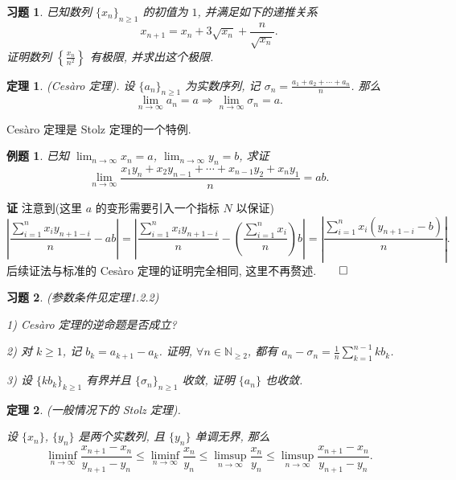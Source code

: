 \documentclass[12pt,a4paper,fontset=none]{ctexart}
\newcounter{theorem_counter}
\theoremstyle{bluehead}
\theoremstyle{greenhead}
\newtheorem{theorem}{定理}[subsection]
\theoremstyle{yellowhead}
\newtheorem{exercise}{习题}[subsection]
\theoremstyle{redhead}
\newtheorem{example}{例题}[subsection]
\begin{document}
\begin{exercise}
已知数列 $\{x_n\}_{n \ge 1}$ 的初值为 $1$, 并满足如下的递推关系
$$
x_{n+1}=x_n+3\sqrt{x_n}+\frac{n}{\sqrt{x_n}}.
$$
证明数列 $\displaystyle \left\{\frac{x_n}{n^2}\right\}$ 有极限, 并求出这个极限.
\end{exercise}

\begin{theorem}
  (Cesàro 定理).
  设 $\{a_n\}_{n \ge 1}$ 为实数序列, 记 $\displaystyle \sigma_n=\frac{a_1+a_2+\cdots +a_n}{n}$. 那么 $$\displaystyle \lim_{n \to \infty} a_n=a \Rightarrow \displaystyle \lim_{n \to \infty} \sigma_n=a.$$
\end{theorem}

Cesàro 定理是 Stolz 定理的一个特例.

\vspace{0.3cm}

\begin{example}
  已知 $\displaystyle \lim_{n \to \infty} x_n=a$, $\displaystyle \lim_{n \to \infty} y_n=b$, 求证
  $$
  \lim_{n \to \infty} \frac{x_1y_n+x_2y_{n-1}+\cdots+x_{n-1}y_2+x_ny_1}{n} = ab.
  $$
\end{example}

\hspace{-2em}\textbf{证} \quad 注意到(这里 $a$ 的变形需要引入一个指标 $N$ 以保证)
$$
\left|\frac{\sum_{i=1}^nx_iy_{n+1-i}}{n}-ab\right|=\left|\frac{\sum_{i=1}^nx_iy_{n+1-i}}{n}-\left(\frac{\sum_{i=1}^nx_i}{n}\right)b\right|=\left|\frac{\sum_{i=1}^nx_i(y_{n+1-i}-b)}{n}\right|.
$$
后续证法与标准的 Cesàro 定理的证明完全相同, 这里不再赘述.\hfill\(\qed\)

\vspace{0.2cm}

\begin{exercise}

(参数条件见定理1.2.2)

1) Cesàro 定理的逆命题是否成立?

2) 对 $k \ge 1$, 记 $b_k=a_{k+1}-a_{k}$. 证明, $\forall n \in \mathbb{N}_{\ge 2}$, 都有 $\displaystyle a_n-\sigma_n=\frac{1}{n}\sum_{k=1}^{n-1}kb_k$.

3) 设 $\{kb_k\}_{k \ge 1}$ 有界并且 $\{\sigma_{n}\}_{n \ge 1}$ 收敛, 证明 $\{a_n\}$ 也收敛.
\end{exercise}

\begin{theorem}
  (一般情况下的 Stolz 定理).

  \hspace{-2em}设 $\{x_n\}$, $\{y_n\}$ 是两个实数列, 且 $\{y_n\}$ 单调无界, 那么
  $$
  \liminf_{n \to \infty} \frac{x_{n+1}-x_n}{y_{n+1}-y_n} \le \liminf_{n \to \infty} \frac{x_n}{y_n} \le \limsup_{n \to \infty} \frac{x_n}{y_n} \le \limsup_{n \to \infty} \frac{x_{n+1}-x_n}{y_{n+1}-y_n}.
  $$
\end{theorem}
\end{document}
